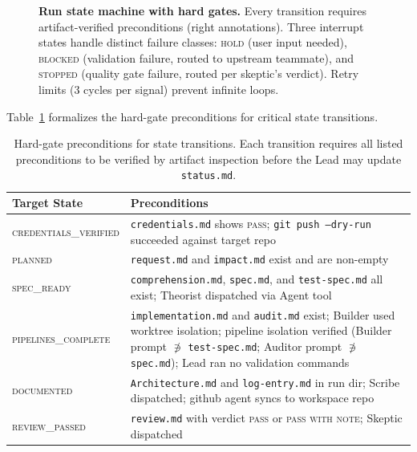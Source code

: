 \begin{figure}[!t]
\caption{%
  \textbf{Run state machine with hard gates.}
  Every transition requires artifact-verified preconditions (right
  annotations). Three interrupt states handle distinct failure
  classes: \textsc{hold} (user input needed), \textsc{blocked}
  (validation failure, routed to upstream teammate), and
  \textsc{stopped} (quality gate failure, routed per skeptic's
  verdict). Retry limits (3 cycles per signal) prevent infinite
  loops.
}
\label{fig:state-machine}
\end{figure}

\noindent
Table~\ref{tab:preconditions} formalizes the hard-gate preconditions
for critical state transitions.

\begin{table}[!t]
\centering
\caption{%
  Hard-gate preconditions for state transitions. Each transition
  requires all listed preconditions to be verified by artifact
  inspection before the Lead may update \texttt{status.md}.
}
\label{tab:preconditions}
\small
\begin{tabular}{@{}lp{6.5cm}@{}}
\toprule
\textbf{Target State} & \textbf{Preconditions} \\
\midrule
\textsc{credentials\_verified} &
  \texttt{credentials.md} shows \textsc{pass};
  \texttt{git push --dry-run} succeeded against target repo \\
\textsc{planned} &
  \texttt{request.md} and \texttt{impact.md} exist and are non-empty \\
\textsc{spec\_ready} &
  \texttt{comprehension.md}, \texttt{spec.md}, and
  \texttt{test-spec.md} all exist; Theorist dispatched via Agent tool \\
\textsc{pipelines\_complete} &
  \texttt{implementation.md} and \texttt{audit.md} exist;
  Builder used worktree isolation; pipeline isolation verified
  (Builder prompt $\not\ni$ \texttt{test-spec.md}; Auditor prompt
  $\not\ni$ \texttt{spec.md}); Lead ran no validation commands \\
\textsc{documented} &
  \texttt{Architecture.md} and \texttt{log-entry.md} in run dir;
  Scribe dispatched; github agent syncs to workspace repo \\
\textsc{review\_passed} &
  \texttt{review.md} with verdict \textsc{pass} or
  \textsc{pass with note}; Skeptic dispatched \\
\bottomrule
\end{tabular}
\end{table}


